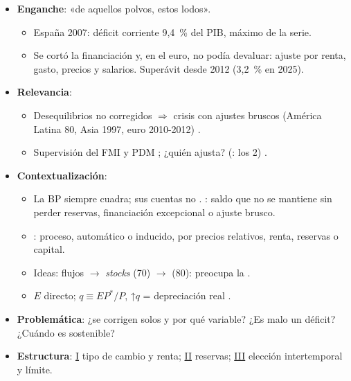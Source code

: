 \documentclass{article}
\begin{document}
\cabecerarepaso
\begin{columnas}

\begin{itemize}
\item \textbf{Enganche}: «de aquellos polvos, estos lodos».
  \begin{itemize}
  \item España 2007: déficit corriente 9,4~\% del PIB, máximo de la serie.
  \item Se cortó la financiación y, en el euro, no podía devaluar: ajuste por renta, gasto, precios y salarios. Superávit desde 2012 (3,2~\% en 2025).
  \end{itemize}
\item \textbf{Relevancia}:
  \begin{itemize}
  \item Desequilibrios no corregidos $\Rightarrow$ crisis con ajustes bruscos (América Latina 80, Asia 1997, euro 2010-2012) .
  \item Supervisión del FMI  y PDM ; ¿quién ajusta? (: los 2) .
  \end{itemize}
\item \textbf{Contextualización}:
  \begin{itemize}
  \item La BP siempre cuadra; sus cuentas no . : saldo que no se mantiene sin perder reservas, financiación excepcional o ajuste brusco.
  \item {}: proceso, automático o inducido, por precios relativos, renta, reservas o capital.
  \item Ideas: flujos $\to$ \emph{stocks} (70) $\to$  (80): preocupa la .
  \item $E$ directo; $q\equiv EP^*/P$, ↑$q$ = depreciación real .
  \end{itemize}
\item \textbf{Problemática}: ¿se corrigen solos y por qué variable? ¿Es malo un déficit? ¿Cuándo es sostenible?
\item \textbf{Estructura}: \hyperref[rep:I]{I} tipo de cambio y renta; \hyperref[rep:II]{II} reservas; \hyperref[rep:III]{III} elección intertemporal y límite.
\end{itemize}


\end{columnas}
\end{document}
